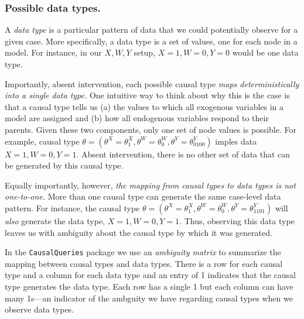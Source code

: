 \documentclass[
  12pt,
]{book}
\begin{document}
\hypertarget{possible-data-types.}{%
\subsubsection{Possible data types.}\label{possible-data-types.}}

A \emph{data type} is a particular pattern of data that we could potentially observe for a given case. More specifically, a data type is a set of values, one for each node in a model. For instance, in our \(X, W, Y\) setup, \(X=1, W=0, Y=0\) would be one data type.

Importantly, absent intervention, each possible causal type \emph{maps deterministically into a single data type.} One intuitive way to think about why this is the case is that a causal type tells us (a) the values to which all exogenous variables in a model are assigned and (b) how all endogenous variables respond to their parents. Given these two components, only one set of node values is possible. For example, causal type \(\theta = (\theta^X = \theta^X_1, \theta^W = \theta^W_0, \theta^Y = \theta^Y_{0100})\) imples data \(X=1, W=0, Y=1\). Absent intervention, there is no other set of data that can be generated by this causal type.

Equally importantly, however, \emph{the mapping from causal types to data types is not one-to-one.} More than one causal type can generate the same case-level data pattern. For instance, the causal type \(\theta = (\theta^X = \theta^X_1, \theta^W = \theta^W_0, \theta^Y = \theta^Y_{1101})\) will \emph{also} generate the data type, \(X=1, W=0, Y=1\). Thus, observing this data type leaves us with ambiguity about the causal type by which it was generated.

In the \texttt{CausalQueries} package we use an \emph{ambiguity matrix} to summarize the mapping between causal types and data types. There is a row for each causal type and a column for each data type and an entry of 1 indicates that the causal type generates the data type. Each row has a single 1 but each column can have many 1s---an indicator of the ambguity we have regarding causal types when we observe data types.
\end{document}
